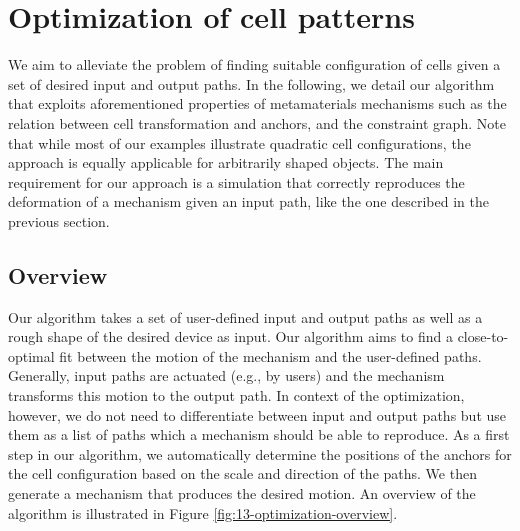 \section{Optimization of cell patterns}
\label{section:optimization}

We aim to alleviate the problem of finding suitable configuration of cells given a set of desired input and output paths. In the following, we detail our algorithm that exploits aforementioned properties of metamaterials mechanisms such as the relation between cell transformation and anchors, and the constraint graph. Note that while most of our examples illustrate quadratic cell configurations, the approach is equally applicable for arbitrarily shaped objects. The main requirement for our approach is a simulation that correctly reproduces the deformation of a mechanism given an input path, like the one described in the previous section.

\subsection{Overview}

Our algorithm takes a set of user-defined input and output paths as well as a rough shape of the desired device as input. Our algorithm aims to find a close-to-optimal fit between the motion of the mechanism and the user-defined paths. Generally, input paths are actuated (e.g., by users) and the mechanism transforms this motion to the output path. In context of the optimization, however, we do not need to differentiate between input and output paths but use them as a list of paths which a mechanism should be able to reproduce. As a first step in our algorithm, we automatically determine the positions of the anchors for the cell configuration based on the scale and direction of the paths. We then generate a mechanism that produces the desired motion. An overview of the algorithm is illustrated in Figure \ref{fig:13-optimization-overview}.

